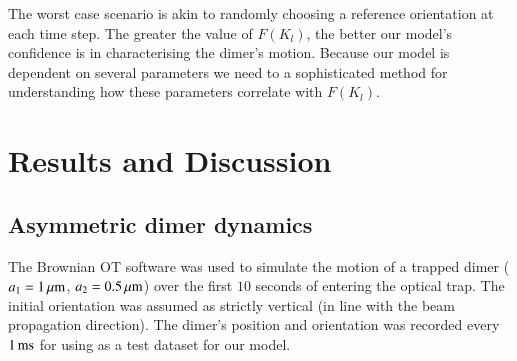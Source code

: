 \documentclass[final,  3p]{elsarticle}
\begin{document}
The worst case scenario is akin to randomly choosing a reference
orientation at each time step. The greater the value of $F(K_l)$, the
better our model's confidence is in characterising the dimer's
motion. Because our model is dependent on several parameters we need
to a sophisticated method for understanding how these parameters
correlate with $F(K_l)$.


\section{Results and  Discussion
\label{sec:Discussion}}


\subsection{Asymmetric dimer dynamics}
\label{sec:motion}

The Brownian OT software was used to simulate the motion of a trapped
dimer ($a_1=1\,\mu{\rm m}$, $a_2=0.5\,\mu{\rm m}$) over the first
$10$ seconds of entering the optical trap.  The initial orientation
was assumed as strictly vertical (in line with the beam propagation
direction). The dimer's position and orientation was recorded every
$1\,{\rm ms}$ for using as a test dataset for our model.
\end{document}
